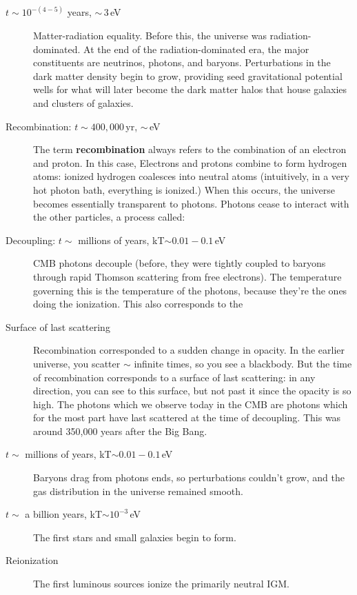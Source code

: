 \documentclass[12pt, letterpaper, preprint]{aastex}
\begin{document}
\begin{enumerate}
\begin{description}
\item[$t \sim 10^{-(4-5)}$ years, $\sim$\,3\,eV] Matter-radiation equality. Before this, the universe was radiation-dominated. At the end of the radiation-dominated era, the major constituents are neutrinos, photons, and baryons. Perturbations in the dark matter density begin to grow, providing seed gravitational potential wells for what will later become the dark matter halos that house galaxies and clusters of galaxies.

\item[Recombination: $t \sim 400,000$\,yr, $\sim$\,eV] The term \textbf{recombination} always refers to the combination of an electron and proton. In this case, Electrons and protons combine to form hydrogen atoms: ionized hydrogen coalesces into neutral atoms (intuitively, in a very hot photon bath, everything is ionized.) When this occurs, the universe becomes essentially transparent to photons. Photons cease to interact with the other particles, a process called:

\item[Decoupling: $t \sim$ millions of years, kT$\sim 0.01-0.1$\,eV] CMB photons decouple (before, they were tightly coupled to baryons through rapid Thomson scattering from free electrons). The temperature governing this is the temperature of the photons, because they're the ones doing the ionization. This also corresponds to the 

\item[Surface of last scattering] Recombination corresponded to a sudden change in opacity. In the earlier universe, you scatter $\sim$ infinite times, so you see a blackbody. But the time of recombination corresponds to a surface of last scattering: in any direction, you can see to this surface, but not past it since the opacity is so high. The photons which we observe today in the CMB are photons which for the most part have last scattered at the time of decoupling. This was around 350,000 years after the Big Bang. 

\item[$t \sim$ millions of years, kT$\sim 0.01-0.1$\,eV] Baryons drag from photons ends, so perturbations couldn't grow, and the gas distribution in the universe remained smooth.

\item[$t \sim$ a billion years, kT$\sim 10^{-3}$\,eV] The first stars and small galaxies begin to form.

\item[Reionization] The first luminous sources ionize the primarily neutral IGM. 


\end{description}
\end{enumerate}
\end{document}
